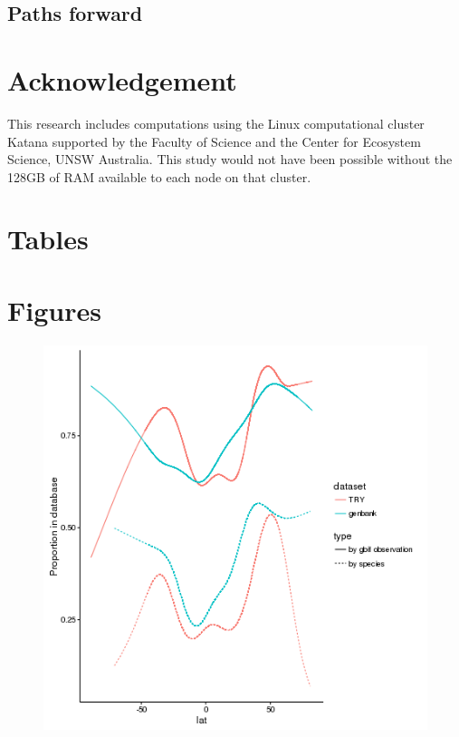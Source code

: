 \documentclass[a4paper,11pt]{article}
\begin{document}
\subsection{Paths forward}



\section{Acknowledgement}

This research includes computations using the Linux computational cluster Katana supported by the Faculty of Science and the Center for Ecosystem Science, UNSW Australia.
This study would not have been possible without the 128GB of RAM available to each node on that cluster.  


\section{Tables}









\section{Figures}

\begin{figure}[h!]
\centering
  \includegraphics[width=\textwidth]{figures/multi_gam.png}
   \label{fig:genbank_try_gam}
\end{figure}
\end{document}
